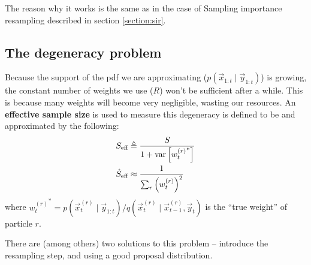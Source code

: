     The reason why it works is the same as in the case of Sampling importance resampling described in section \ref{section:sir}.

\subsection{The degeneracy problem}
    Because the support of the pdf we are approximating ($p(\vec x_{1:t} \mid \vec y_{1:t})$) is growing, the constant number of weights we use ($R$) won't be sufficient after a while. This is because many weights will become very negligible, wasting our resources. An \textbf{effective sample size} is used to measure this degeneracy is defined to be and approximated by the following:
    \begin{align}
        S_\text{eff}        &\triangleq \frac{S}{1 + \operatorname{\mathrm{var}}\left[{w_t^{(r)}}^\ast\right]} \\
        \hat S_\text{eff}   &\approx \frac{1}{\sum_r \left(w_t^{(r)}\right)^2}\label{eq:Seff}
    \end{align}
    where ${w_t^{(r)}}^\ast = p(\vec x_t^{(r)} \mid \vec y_{1:t}) / q(\vec x_t^{(r)} \mid \vec x_{t-1}^{(r)}, \vec y_t)$ is the ``true weight'' of particle $r$.

    There are (among others) two solutions to this problem -- introduce the resampling step, and using a good proposal distribution.

